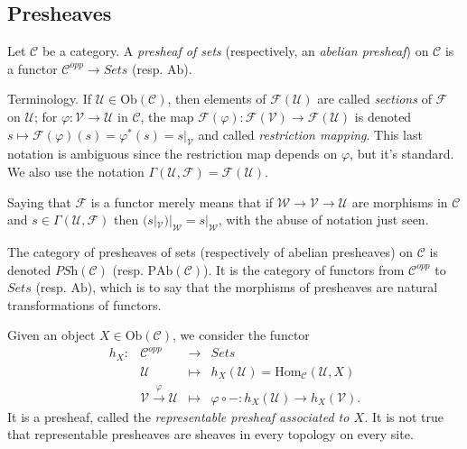 \subsection{Presheaves}

\begin{definition}
Let $\mathcal{C}$ be a category. A \emph{presheaf of sets} (respectively, an \emph{abelian presheaf}) on $\mathcal{C}$ is a functor $\mathcal{C}^{opp} \to \textit{Sets}$ (resp. $\text{Ab}$).
\end{definition}

\begin{remark}
\label{remark-terminology}
Terminology.
If $\mathcal{U} \in \text{Ob}(\mathcal{C})$, then elements of $\mathcal{F}(\mathcal{U})$ are called \emph{sections} of $\mathcal{F}$ on $\mathcal{U}$; for $\varphi: \mathcal{V} \to \mathcal{U}$ in $\mathcal{C}$, the map $\mathcal{F}(\varphi) : \mathcal{F}(\mathcal{V}) \to \mathcal{F}(\mathcal{U})$ is denoted $s \mapsto \mathcal{F}(\varphi) (s) = \varphi^* (s) = s |_\mathcal{V} $ and called \emph{restriction mapping}. This last notation is ambiguous since the restriction map depends on $\varphi$, but it's standard. We also use the notation $\Gamma(\mathcal{U}, \mathcal{F}) = \mathcal{F}(\mathcal{U})$.
\end{remark}

Saying that $\mathcal{F}$ is a functor merely means that if $\mathcal{W} \to \mathcal{V} \to \mathcal{U}$ are morphisms in $\mathcal{C}$ and $s \in \Gamma(\mathcal{U},\mathcal{F})$ then $(s|_\mathcal{V})|_\mathcal{W} = s |_\mathcal{W}$, with the abuse of notation just seen.

The category of presheaves of sets (respectively of abelian presheaves) on $\mathcal{C}$ is denoted $\textit{PSh} (\mathcal{C})$ (resp. $\text{PAb} (\mathcal{C})$). It is the category of functors from $\mathcal{C}^{opp}$ to $\textit{Sets}$ (resp. $\text{Ab}$), which is to say that the morphisms of presheaves are natural transformations of functors. 

\begin{example}
Given an object $X \in \text{Ob}(\mathcal{C})$, we consider the functor
$$
\begin{array}{rccl}
h_X : & \mathcal{C}^{opp} & \to & \textit{Sets} \\
& \mathcal{U} & \mapsto & h_X(\mathcal{U}) = \text{Hom}_\mathcal{C} (\mathcal{U},X) \\
& \mathcal{V}\xrightarrow{\varphi} \mathcal{U} & \mapsto & \varphi \circ  - : h_X(\mathcal{U}) \to h_X(\mathcal{V}).
\end{array}
$$
It is a presheaf, called the \emph{representable presheaf associated to $X$.} It is not true that representable presheaves are sheaves in every topology on every site.
\end{example}

